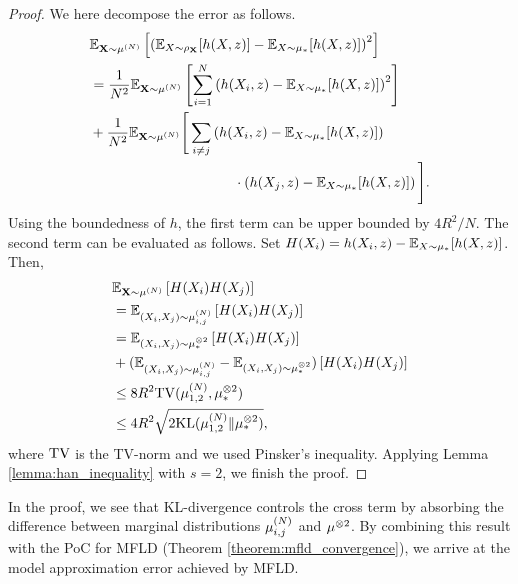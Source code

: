\begin{proof}
    We here decompose the error as follows.
    \begin{align*}
        &\bE_{\vX \sim \pow[\mu,N]}\left[ \left( \bE_{X \sim \rho_\vX}[ h(X,z)] - \bE_{X\sim\mu_*}[h(X,z)]\right)^2 \right] \\
        &= \frac{1}{N^2}\bE_{\vX \sim \pow[\mu,N]}\left[ \sum_{i=1}^N\left( h(X_i,z) - \bE_{X\sim\mu_*}[h(X,z)]\right)^2 \right] \\
        &+ \frac{1}{N^2}\bE_{\vX \sim \pow[\mu,N]}
        \Bigg[ \sum_{i\neq j}\left( h(X_i,z) - \bE_{X\sim\mu_*}[h(X,z)]\right) \\
        &~~~~~~~~~~~~~~~~~~~~~~~~~~~~~~~\cdot\left( h(X_j,z) - \bE_{X\sim\mu_*}[h(X,z)]\right) \Bigg].
    \end{align*}
    Using the boundedness of $h$, the first term can be upper bounded by $4R^2/N$. The second term can be evaluated as follows. Set $H(X_i)=h(X_i,z) - \mathbb{E}_{X\sim\mu_*}[h(X,z)]$. Then,
    \begin{align*}
        &\bE_{\vX \sim \pow[\mu,N]}\left[ H(X_i)H(X_j) \right]\\
        &= \bE_{(X_i,X_j) \sim \pow[\mu,N]_{i,j}}\left[ H(X_i)H(X_j) \right] \\
        &= \bE_{(X_i,X_j) \sim \tensor[\mu_*,2]}\left[ H(X_i)H(X_j) \right] \\
        &+ (\bE_{(X_i,X_j) \sim \pow[\mu,N]_{i,j}} - \bE_{(X_i,X_j) \sim \tensor[\mu_*,2]})\left[ H(X_i)H(X_j) \right] \\
        &\leq 8R^2 \TV (\pow[\mu,N]_{1,2}, \tensor[\mu_*,2]) \\
        &\leq 4R^2 \sqrt{ 2\KL(\pow[\mu,N]_{1,2}\|\tensor[\mu_*,2])}, 
    \end{align*}
    where $\mathrm{TV}$ is the TV-norm and we used Pinsker's inequality.
    Applying Lemma \ref{lemma:han_inequality} with $s=2$, we finish the proof.
\end{proof}
In the proof, we see that KL-divergence controls the cross term by absorbing the difference between marginal distributions $\pow[\mu,N]_{i,j}$ and $\tensor[\mu,2]$. By combining this result with the PoC for MFLD (Theorem \ref{theorem:mfld_convergence}), we arrive at the model approximation error achieved by MFLD. 


